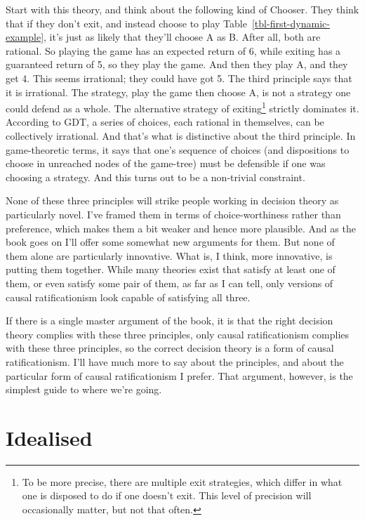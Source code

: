 \documentclass[
  12pt,
  letterpaper,
  DIV=11,
  numbers=noendperiod]{scrreprt}
\begin{document}
Start with this theory, and think about the following kind of Chooser.
They think that if they don't exit, and instead choose to play
Table~\ref{tbl-first-dynamic-example}, it's just as likely that they'll
choose A as B. After all, both are rational. So playing the game has an
expected return of 6, while exiting has a guaranteed return of 5, so
they play the game. And then they play A, and they get 4. This seems
irrational; they could have got 5. The third principle says that it is
irrational. The strategy, play the game then choose A, is not a strategy
one could defend as a whole. The alternative strategy of
exiting\footnote{To be more precise, there are multiple exit strategies,
  which differ in what one is disposed to do if one doesn't exit. This
  level of precision will occasionally matter, but not that often.}
strictly dominates it. According to GDT, a series of choices, each
rational in themselves, can be collectively irrational. And that's what
is distinctive about the third principle. In game-theoretic terms, it
says that one's sequence of choices (and dispositions to choose in
unreached nodes of the game-tree) must be defensible if one was choosing
a strategy. And this turns out to be a non-trivial constraint.

None of these three principles will strike people working in decision
theory as particularly novel. I've framed them in terms of
choice-worthiness rather than preference, which makes them a bit weaker
and hence more plausible. And as the book goes on I'll offer some
somewhat new arguments for them. But none of them alone are particularly
innovative. What is, I think, more innovative, is putting them together.
While many theories exist that satisfy at least one of them, or even
satisfy some pair of them, as far as I can tell, only versions of causal
ratificationism look capable of satisfying all three.

If there is a single master argument of the book, it is that the right
decision theory complies with these three principles, only causal
ratificationism complies with these three principles, so the correct
decision theory is a form of causal ratificationism. I'll have much more
to say about the principles, and about the particular form of causal
ratificationism I prefer. That argument, however, is the simplest guide
to where we're going.


\hypertarget{sec-ideal}{%
\chapter{Idealised}\label{sec-ideal}}
\end{document}

